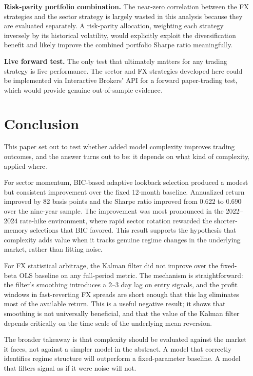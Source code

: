 \documentclass[12pt]{article}
\begin{document}
\textbf{Risk-parity portfolio combination.} The near-zero correlation between the FX strategies and the sector strategy is largely wasted in this analysis because they are evaluated separately. A risk-parity allocation, weighting each strategy inversely by its historical volatility, would explicitly exploit the diversification benefit and likely improve the combined portfolio Sharpe ratio meaningfully.

\textbf{Live forward test.} The only test that ultimately matters for any trading strategy is live performance. The sector and FX strategies developed here could be implemented via Interactive Brokers' API for a forward paper-trading test, which would provide genuine out-of-sample evidence.

\section{Conclusion}

This paper set out to test whether added model complexity improves trading outcomes, and the answer turns out to be: it depends on what kind of complexity, applied where.

For sector momentum, BIC-based adaptive lookback selection produced a modest but consistent improvement over the fixed 12-month baseline. Annualized return improved by 82 basis points and the Sharpe ratio improved from 0.622 to 0.690 over the nine-year sample. The improvement was most pronounced in the 2022--2024 rate-hike environment, where rapid sector rotation rewarded the shorter-memory selections that BIC favored. This result supports the hypothesis that complexity adds value when it tracks genuine regime changes in the underlying market, rather than fitting noise.

For FX statistical arbitrage, the Kalman filter did not improve over the fixed-beta OLS baseline on any full-period metric. The mechanism is straightforward: the filter's smoothing introduces a 2--3 day lag on entry signals, and the profit windows in fast-reverting FX spreads are short enough that this lag eliminates most of the available return. This is a useful negative result; it shows that smoothing is not universally beneficial, and that the value of the Kalman filter depends critically on the time scale of the underlying mean reversion.

The broader takeaway is that complexity should be evaluated against the market it faces, not against a simpler model in the abstract. A model that correctly identifies regime structure will outperform a fixed-parameter baseline. A model that filters signal as if it were noise will not.
\end{document}
